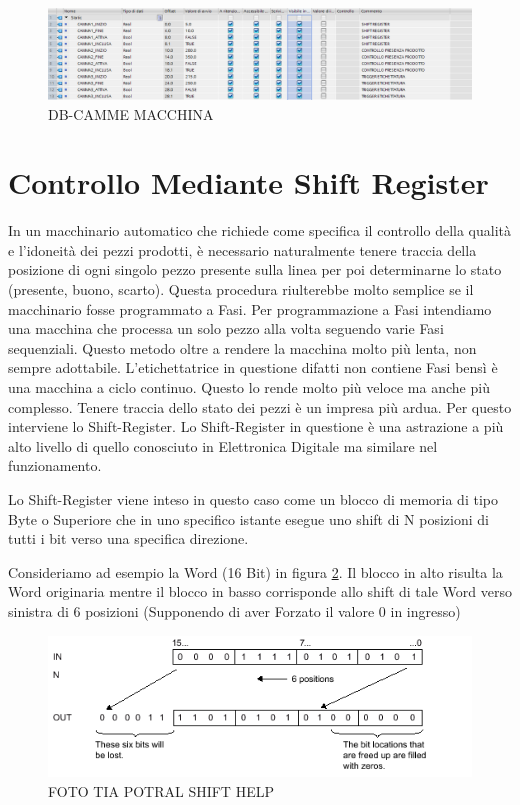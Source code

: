\documentclass[12pt, a4paper, oneside]{book}
\begin{document}
\begin{figure}[H]
	\centering
	\includegraphics[width=12cm]{Immagini/CAM1}
	\caption{ DB-CAMME MACCHINA}
	\label{CAMME4}
\end{figure}


\section{Controllo Mediante Shift Register}
In un macchinario automatico che richiede come specifica il controllo della qualità e l'idoneità dei pezzi prodotti, è necessario naturalmente tenere traccia della posizione di ogni singolo pezzo presente sulla linea per poi determinarne lo stato (presente, buono, scarto). Questa procedura riulterebbe molto semplice se il macchinario fosse programmato a Fasi. Per programmazione a Fasi intendiamo una macchina che processa un solo pezzo alla volta seguendo varie Fasi sequenziali. Questo metodo oltre a rendere la macchina molto più lenta, non sempre adottabile. L'etichettatrice in questione difatti non contiene Fasi bensì è una macchina a ciclo continuo. Questo lo rende molto più veloce ma anche più complesso. Tenere traccia dello stato dei pezzi è un impresa più ardua. Per questo interviene lo Shift-Register.
Lo Shift-Register in questione è una astrazione a più alto livello di quello conosciuto in Elettronica Digitale ma similare nel funzionamento.

Lo Shift-Register viene inteso in questo caso come un blocco di memoria di tipo Byte o Superiore che in uno specifico istante esegue uno shift di N posizioni di tutti i bit verso una specifica direzione.

Consideriamo ad esempio la Word (16 Bit) in figura \ref{sh1}. Il blocco in alto risulta la Word originaria mentre il blocco in basso corrisponde allo shift di tale Word verso sinistra di 6 posizioni (Supponendo di aver Forzato il valore 0 in ingresso)

\begin{figure}[H]
	\centering
	\includegraphics[width=12cm]{Immagini/SH1}
	\caption{ FOTO TIA POTRAL SHIFT HELP}
	\label{sh1}
\end{figure}
\end{document}
